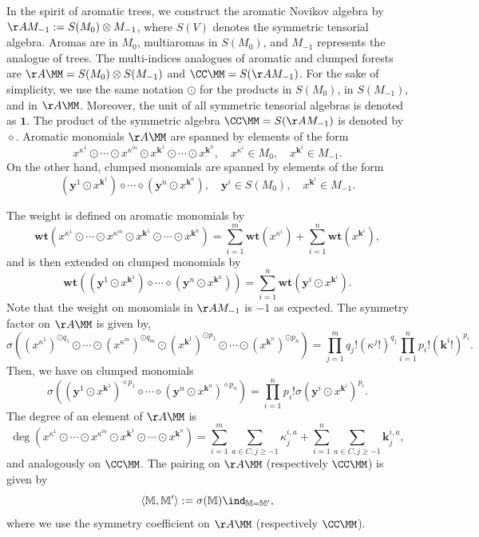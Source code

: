 \documentclass[a4paper,11pt]{article}
\begin{document}
In the spirit of aromatic trees, we construct the aromatic Novikov algebra by $\AA M_{-1}:= S(M_0)\otimes M_{-1}$, where $S(V)$ denotes the symmetric tensorial algebra. Aromas are in $M_0$, multiaromas in $S(M_0)$, and $M_{-1}$ represents the analogue of trees.
The multi-indices analogues of aromatic and clumped forests are $\AA\MM=S(M_0)\otimes S(M_{-1})$ and $\CC\MM=S(\AA M_{-1})$.
For the sake of simplicity, we use the same notation $\odot$ for the products in $S(M_0)$, in $S(M_{-1})$, and in $\AA\MM$. Moreover, the unit of all symmetric tensorial algebras is denoted as $\mathbf{1}$.
The product of the symmetric algebra $\CC\MM=S(\AA M_{-1})$ is denoted by $\diamond$.
Aromatic monomials $\AA\MM$ are spanned by elements of the form
$$x^{\kappa^1}\odot \cdots \odot x^{\kappa^m} \odot x^{\mathbf k^1}\odot \cdots \odot x^{\mathbf k^n},\quad x^{\kappa^i}\in M_0,\quad x^{\mathbf k^i}\in M_{-1}.$$
On the other hand, clumped monomials are spanned by elements of the form
$$(\mathbf y^1\odot x^{\mathbf k^1})\diamond \cdots \diamond (\mathbf y^n\odot x^{\mathbf k^n}),\quad \mathbf y^i\in S(M_0),\quad x^{\mathbf k^i}\in M_{-1}.$$

The weight is defined on aromatic monomials by
\[\mathbf {wt}(x^{\kappa^1}\odot \cdots \odot x^{\kappa^m} \odot x^{\mathbf k^1}\odot \cdots \odot x^{\mathbf k^n})
=\sum_{i=1}^m \mathbf {wt}(x^{\kappa^i}) +\sum_{i=1}^n \mathbf {wt}(x^{\mathbf k^i}),\]
and is then extended on clumped monomials by
\[\mathbf {wt}((\mathbf y^1\odot x^{\mathbf k^1})\diamond \cdots \diamond (\mathbf y^n\odot x^{\mathbf k^n}))
=\sum_{i=1}^n \mathbf {wt}(\mathbf y^i\odot x^{\mathbf k^i}).\]
Note that the weight on monomials in $\AA M_{-1}$ is $-1$ as expected.
%
The symmetry factor on $\AA \MM$ is given by,
\[\sigma ((x^{\kappa^1})^{\odot q_1}\odot \cdots \odot (x^{\kappa^m})^{\odot q_m} \odot (x^{\mathbf k^1})^{\odot p_1}\odot \cdots \odot (x^{\mathbf k^n})^{\odot p_n})
=\prod_{j=1}^m q_j!(\kappa^j!)^{q_j}\prod_{i=1}^n p_i!(\mathbf k^i!)^{p_i}.\]
Then, we have on clumped monomials
\[\sigma ((\mathbf y^1\odot x^{\mathbf k^1})^{\diamond p_1}\diamond \cdots \diamond (\mathbf y^n\odot x^{\mathbf k^n})^{\diamond p_n})
=\prod_{i=1}^n p_i!\sigma (\mathbf y^i\odot x^{\mathbf k^i})^{p_i}.\]
%
The degree of an element of $\AA \MM$ is
\[
\deg(x^{\kappa^1}\odot \cdots \odot x^{\kappa^m} \odot x^{\mathbf k^1}\odot \cdots \odot x^{\mathbf k^n})
=\sum_{i=1}^m \sum_{a\in C, j\geq -1}\kappa_{j}^{i,a} +\sum_{i=1}^n \sum_{a\in C, j\geq -1}\mathbf k_{j}^{i,a},\]
and analogously on $\CC\MM$.
%
The pairing on $\AA \MM$ (respectively $\CC\MM$) is given by
\[\langle\mathbb M, \mathbb M'\rangle:= \sigma(\mathbb M)\ind_{\mathbb M=\mathbb M'},\]
where we use the symmetry coefficient on $\AA\MM$ (respectively $\CC\MM$).
\end{document}
